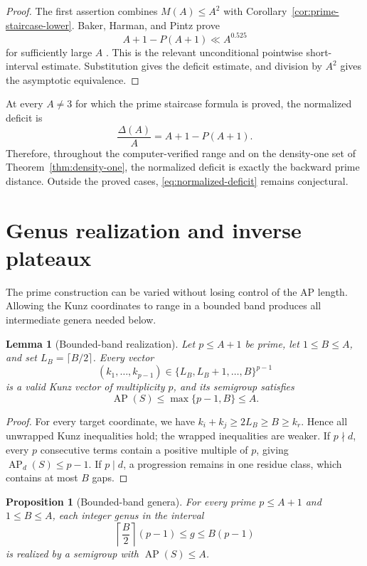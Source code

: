 \documentclass[11pt]{article}
\theoremstyle{plain}
\newtheorem{proposition}[theorem]{Proposition}
\newtheorem{lemma}[theorem]{Lemma}
\theoremstyle{definition}
\theoremstyle{remark}
\newcommand{\AP}{\operatorname{AP}}
\begin{document}
\begin{proof}
The first assertion combines $M(A)\leq A^2$ with
Corollary~\ref{cor:prime-staircase-lower}.  Baker, Harman, and Pintz prove
\[
  A+1-P(A+1)\ll A^{0.525}
\]
for sufficiently large $A$ \cite{baker-harman-pintz}.  This is the relevant
unconditional pointwise short-interval estimate.  Substitution gives the
deficit estimate, and division by $A^2$ gives the asymptotic equivalence.
\end{proof}

At every $A\neq 3$ for which the prime staircase formula is proved, the
normalized deficit is
\begin{equation}\label{eq:normalized-deficit}
  \boxed{\frac{\Delta(A)}A=A+1-P(A+1).}
\end{equation}
Therefore, throughout the computer-verified range and on the density-one set of
Theorem~\ref{thm:density-one}, the normalized deficit is exactly the backward
prime distance.  Outside the proved cases, \eqref{eq:normalized-deficit}
remains conjectural.

\section{Genus realization and inverse plateaux}\label{sec:realization}

The prime construction can be varied without losing control of the AP
length.  Allowing the Kunz coordinates to range in a bounded band produces
all intermediate genera needed below.

\begin{lemma}[Bounded-band realization]\label{lem:bounded-band}
Let $p\leq A+1$ be prime, let $1\leq B\leq A$, and set
$L_B=\lceil B/2\rceil$.  Every vector
\[
  (k_1,\ldots,k_{p-1})\in\{L_B,L_B+1,\ldots,B\}^{p-1}
\]
is a valid Kunz vector of multiplicity $p$, and its semigroup satisfies
\[
  \boxed{\AP(S)\leq\max\{p-1,B\}\leq A.}
\]
\end{lemma}

\begin{proof}
For every target coordinate, we have
$k_i+k_j\geq2L_B\geq B\geq k_r$.  Hence all unwrapped Kunz inequalities hold;
the wrapped inequalities are weaker.  If $p\nmid d$, every $p$ consecutive
terms contain a positive multiple of $p$, giving $\AP_d(S)\leq p-1$.  If
$p\mid d$, a progression remains in one residue class, which contains at
most $B$ gaps.
\end{proof}

\begin{proposition}[Bounded-band genera]\label{prop:bounded-band-genera}
For every prime $p\leq A+1$ and $1\leq B\leq A$, each integer genus in the
interval
\[
  \left\lceil\frac B2\right\rceil(p-1)
  \leq g\leq B(p-1)
\]
is realized by a semigroup with $\AP(S)\leq A$.
\end{proposition}
\end{document}
